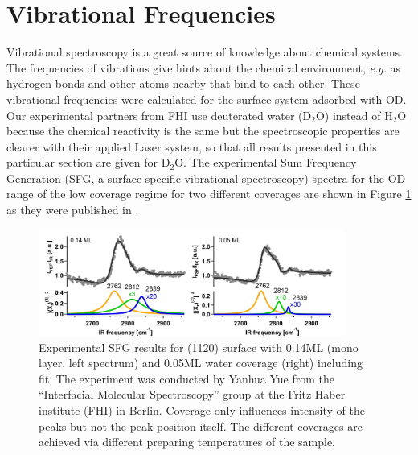 \documentclass[11pt,DIV=13,BCOR=5mm,a4paper,headinclude]{scrbook}
\begin{document}
\clearpage
\section{Vibrational Frequencies}\label{sec:vib11-20}

Vibrational spectroscopy is a great source of knowledge about chemical systems.
The frequencies of vibrations give hints about the chemical environment, \textit{e.g.} as hydrogen bonds and other atoms nearby that bind to each other.
These vibrational frequencies were calculated for the surface system adsorbed with OD.
Our experimental partners from FHI use deuterated water (D$_2$O) instead of H$_2$O because the chemical reactivity is the same but the spectroscopic properties are clearer with their applied Laser system, so that all results presented in this particular section are given for D$_2$O.
The experimental Sum Frequency Generation (SFG, a surface specific vibrational spectroscopy) spectra for the OD range of the low coverage regime for two different coverages are shown in Figure \ref{abb:exp-sfg} as they were published in \cite{Heiden11-20_2018}.
\begin{figure}[!ht]
 \centering
\includegraphics[width=0.9\textwidth]{figures/11-20/SFG_fit.jpg}
 \caption{Experimental SFG results for (11\=20) surface with 0.14ML (mono layer, left spectrum) and 0.05ML water coverage (right) including fit.
The experiment was conducted by Yanhua Yue from the ``Interfacial Molecular Spectroscopy'' group at the Fritz Haber institute (FHI) in Berlin.
Coverage only influences intensity of the peaks but not the peak position itself.
The different coverages are achieved via different preparing temperatures of the sample.}
        \label{abb:exp-sfg}
 \end{figure}
\end{document}
